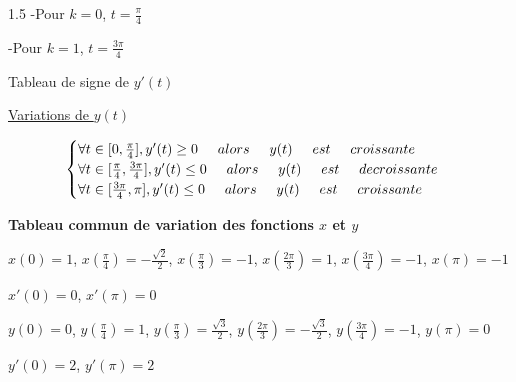 \documentclass[12pt]{article}
\begin{document}
\begin{spacing}{1.5}
-Pour $k=0$, $t=\frac{\pi}{4}$

-Pour $k=1$, $t=\frac{3\pi}{4}$

Tableau de signe de $y'(t)$


\underline{Variations de $y(t)$}

\[
\begin{cases}
\forall t\in [0,\frac{\pi}{4}],y'(t)\geq 0\hspace*{0.5cm} alors\hspace*{0.5cm} y(t)\hspace*{0.5cm} est \hspace*{0.5cm}croissante\\
\forall t\in [\frac{\pi}{4}, \frac{3\pi}{4}], y'(t)\leq 0 \hspace*{0.5cm} alors\hspace*{0.5cm} y(t)\hspace*{0.5cm} est\hspace*{0.5cm} decroissante\\
\forall t\in [\frac{3\pi}{4},\pi], y'(t)\leq 0\hspace*{0.5cm} alors\hspace*{0.5cm} y(t)\hspace*{0.5cm} est\hspace*{0.5cm} croissante
\end{cases}
\]

\medskip\textbf{Tableau commun de variation des fonctions $x$ et $y$}

$x(0)=1$, $x(\frac{\pi}{4})=-\frac{\sqrt{2}}{2}$, $x(\frac{\pi}{3})=-1$, $x(\frac{2\pi}{3})=1$, $x(\frac{3\pi}{4})=-1$, $x(\pi)=-1$

$x'(0)=0$, $x'(\pi)=0$

$y(0)=0$, $y(\frac{\pi}{4})=1$, $y(\frac{\pi}{3})=\frac{\sqrt{3}}{2}$, $y(\frac{2\pi}{3})=-\frac{\sqrt{3}}{2}$, $y(\frac{3\pi}{4})=-1$, $y(\pi)=0$

$y'(0)=2$, $y'(\pi)=2$

\begin{center}
\end{center}
\end{spacing}
\end{document}
